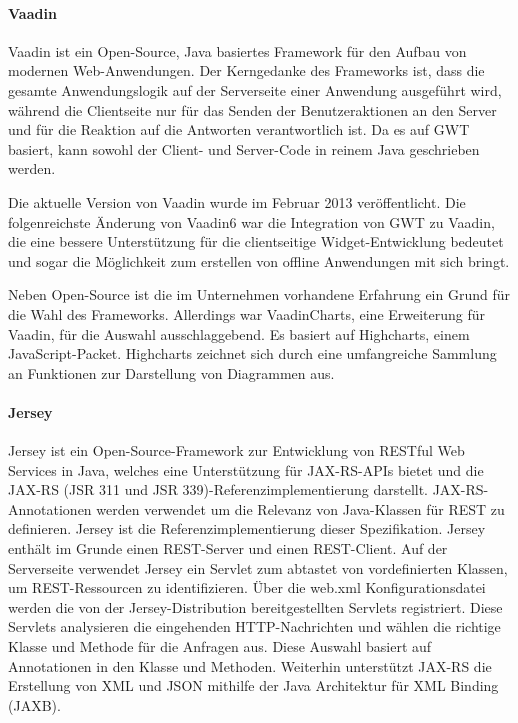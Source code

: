 \paragraph{Vaadin}

Vaadin ist ein Open-Source, Java basiertes Framework für den Aufbau von modernen Web-Anwendungen. Der Kerngedanke des Frameworks ist, dass die gesamte Anwendungslogik auf der Serverseite einer Anwendung ausgeführt wird, während die Clientseite nur für das Senden der Benutzeraktionen an den Server und für die Reaktion auf die Antworten verantwortlich ist. Da es auf GWT basiert, kann sowohl der Client- und Server-Code in reinem Java geschrieben werden.

Die aktuelle Version von Vaadin wurde im Februar 2013 veröffentlicht. Die folgenreichste Änderung von Vaadin6 war die Integration von GWT zu Vaadin, die eine bessere Unterstützung für die clientseitige Widget-Entwicklung bedeutet und sogar die Möglichkeit zum erstellen von offline Anwendungen mit sich bringt.

Neben Open-Source ist die im Unternehmen vorhandene Erfahrung ein Grund für die Wahl des Frameworks. Allerdings war VaadinCharts, eine Erweiterung für Vaadin, für die Auswahl ausschlaggebend. Es basiert auf Highcharts, einem JavaScript-Packet. Highcharts zeichnet sich durch eine umfangreiche Sammlung an Funktionen zur Darstellung von Diagrammen aus. 

\paragraph{Jersey}

Jersey ist ein Open-Source-Framework zur Entwicklung von RESTful Web Services in Java, welches eine Unterstützung für JAX-RS-APIs bietet und die JAX-RS (JSR 311 und JSR 339)-Referenzimplementierung darstellt. JAX-RS-Annotationen werden verwendet um die Relevanz von Java-Klassen für REST zu definieren. Jersey ist die Referenzimplementierung dieser Spezifikation. Jersey enthält im Grunde einen REST-Server und einen REST-Client. Auf der Serverseite verwendet Jersey ein Servlet zum  abtastet von vordefinierten Klassen, um REST-Ressourcen zu identifizieren. Über die web.xml Konfigurationsdatei werden die von der Jersey-Distribution bereitgestellten Servlets registriert. Diese Servlets analysieren die eingehenden HTTP-Nachrichten und wählen die richtige Klasse und Methode für die Anfragen aus. Diese Auswahl basiert auf Annotationen in den Klasse und Methoden. Weiterhin unterstützt JAX-RS die Erstellung von XML und JSON mithilfe der Java Architektur für XML Binding (JAXB).

